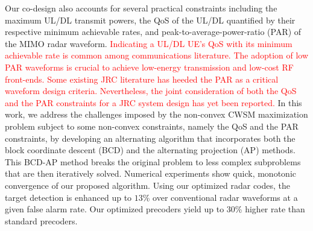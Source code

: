 \documentclass[10pt,journal]{IEEEtran}
\theoremstyle{definition}
\begin{document}
	Our co-design also accounts for several practical constraints including the maximum UL/DL transmit powers, the QoS of the UL/DL quantified by their respective minimum achievable rates, and peak-to-average-power-ratio (PAR) of the MIMO radar waveform. %
	\textcolor{red}{Indicating a UL/DL UE's QoS with its minimum achievable rate is common among communications literature\cite{MIMOCOMSecrecy}. The adoption of low PAR waveforms is crucial to achieve low-energy transmission and low-cost RF front-ends\cite{liu2018toward}. Some existing JRC literature\cite{Petropulu2020dfrc,liu2018toward} has heeded the PAR as a critical waveform design criteria. Nevertheless, the joint consideration of both the QoS and the PAR constraints for a JRC system design has yet been reported.} In this work, we address the challenges imposed by the non-convex CWSM maximization problem subject to some non-convex constraints, namely the QoS and the PAR constraints, by developing an alternating algorithm that incorporates both the block coordinate descent (BCD) and the alternating projection (AP) methods. This BCD-AP method breaks the original problem to less complex subproblems that are then iteratively solved. Numerical experiments show quick, monotonic convergence of our proposed algorithm. Using our optimized radar codes, the target detection is enhanced up to $13$\% over conventional radar waveforms at a given false alarm rate. Our optimized precoders yield up to $30$\% higher rate than standard precoders. %
	
\end{document}
